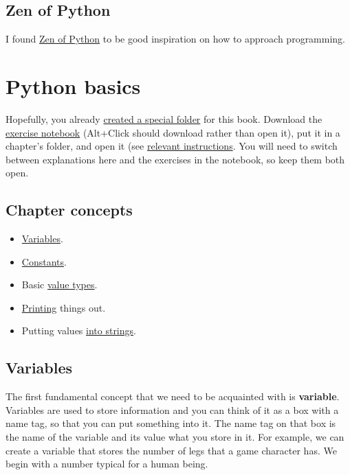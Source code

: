 \documentclass[
]{book}
\providecommand{\tightlist}{%
  \setlength{\itemsep}{0pt}\setlength{\parskip}{0pt}}
\begin{document}
\hypertarget{zen-of-python}{%
\section{Zen of Python}\label{zen-of-python}}

I found \href{https://www.python.org/dev/peps/pep-0020/}{Zen of Python} to be good inspiration on how to approach programming.

\hypertarget{python-basics}{%
\chapter{Python basics}\label{python-basics}}

Hopefully, you already \protect\hyperlink{files-folder}{created a special folder} for this book. Download the \href{notebooks/Seminar\%2001.\%20Basics.ipynb}{exercise notebook} (Alt+Click should download rather than open it), put it in a chapter's folder, and open it (see \protect\hyperlink{jupyter-notebooks}{relevant instructions}. You will need to switch between explanations here and the exercises in the notebook, so keep them both open.

\hypertarget{chapter-concepts}{%
\section{Chapter concepts}\label{chapter-concepts}}

\begin{itemize}
\tightlist
\item
  \protect\hyperlink{variables}{Variables}.
\item
  \protect\hyperlink{constants}{Constants}.
\item
  Basic \protect\hyperlink{value-types}{value types}.
\item
  \protect\hyperlink{print}{Printing} things out.
\item
  Putting values \protect\hyperlink{string-formatting}{into strings}.
\end{itemize}

\hypertarget{variables}{%
\section{Variables}\label{variables}}

The first fundamental concept that we need to be acquainted with is \textbf{variable}. Variables are used to store information and you can think of it as a box with a name tag, so that you can put something into it. The name tag on that box is the name of the variable and its value what you store in it. For example, we can create a variable that stores the number of legs that a game character has. We begin with a number typical for a human being.
\end{document}
